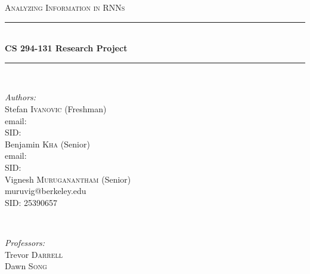 \begin{titlepage}

\newcommand{\HRule}{\rule{\linewidth}{0.5mm}} %

\center %
 

\textsc{\LARGE Analyzing Information in RNNs}\\[0.5cm] %


\HRule \\[0.4cm]
{ \huge \bfseries CS 294-131 Research Project}\\[0.4cm] %
\HRule \\[1.5cm]
 

\begin{minipage}{0.5\textwidth}
\begin{flushleft} \large
\emph{Authors:}\\
Stefan \textsc{Ivanovic} (Freshman) \\%
email: \\
SID: \\
\bigskip
Benjamin \textsc{Kha} (Senior) \\%
email: \\
SID: \\
\bigskip
Vignesh \textsc{Muruganantham} (Senior) \\%
muruvig@berkeley.edu\\
SID: 25390657\\
\end{flushleft}
\end{minipage}
~
\begin{minipage}{0.4\textwidth}
\begin{flushright} \large
\emph{Professors:} \\
Trevor \textsc{Darrell} \\%
Dawn \textsc{Song} \\%
\end{flushright}
\end{minipage}\\[2cm]


\end{titlepage}
